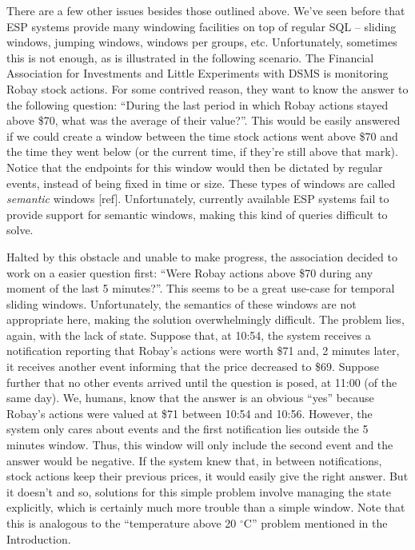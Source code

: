 \documentclass{report}
\begin{document}
There are a few other issues besides those outlined above. We've seen
before that ESP systems provide many windowing facilities on top of
regular SQL -- sliding windows, jumping windows, windows per groups,
etc. Unfortunately, sometimes this is not enough, as is illustrated in
the following scenario. The Financial Association for Investments and
Little Experiments with DSMS is monitoring Robay stock actions. For
some contrived reason, they want to know the answer to the following
question: ``During the last period in which Robay actions stayed above
\$70, what was the average of their value?''. This would be easily
answered if we could create a window between the time stock actions
went above \$70 and the time they went below (or the current time, if
they're still above that mark). Notice that the endpoints for this
window would then be dictated by regular events, instead of being
fixed in time or size. These types of windows are called
\emph{semantic} windows [ref]. Unfortunately, currently available ESP
systems fail to provide support for semantic windows, making this kind
of queries difficult to solve.

Halted by this obstacle and unable to make progress, the association
decided to work on a easier question first: ``Were Robay actions above
\$70 during any moment of the last 5 minutes?''. This seems to be a
great use-case for temporal sliding windows. Unfortunately, the
semantics of these windows are not appropriate here, making the
solution overwhelmingly difficult. The problem lies, again, with the
lack of state. Suppose that, at 10:54, the system receives a
notification reporting that Robay's actions were worth \$71 and, 2
minutes later, it receives another event informing that the price
decreased to \$69. Suppose further that no other events arrived until
the question is posed, at 11:00 (of the same day). We, humans, know
that the answer is an obvious ``yes'' because Robay's actions were
valued at \$71 between 10:54 and 10:56. However, the system only cares
about events and the first notification lies outside the 5 minutes
window. Thus, this window will only include the second event and the
answer would be negative. If the system knew that, in between
notifications, stock actions keep their previous prices, it would
easily give the right answer. But it doesn't and so, solutions for
this simple problem involve managing the state explicitly, which is
certainly much more trouble than a simple window. Note that this is
analogous to the ``temperature above 20 $^{\circ}$C'' problem
mentioned in the Introduction.
\end{document}
